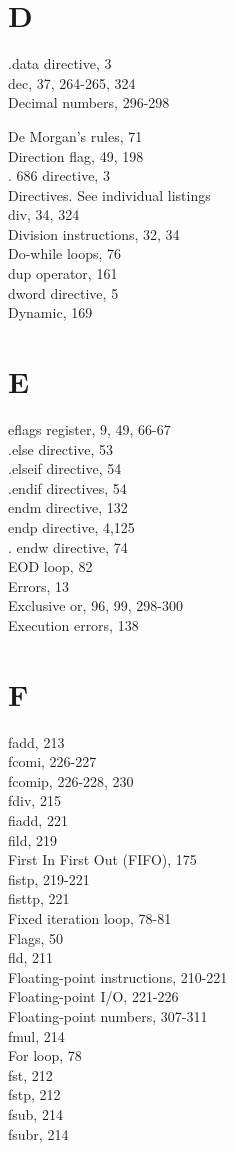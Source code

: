 \documentclass[10pt]{book}
\begin{document}
\section{D}
.data directive, 3\\
dec, 37, 264-265, 324\\
Decimal numbers, 296-298

De Morgan's rules, 71\\
Direction flag, 49, 198\\
. 686 directive, 3\\
Directives. See individual listings\\
div, 34, 324\\
Division instructions, 32, 34\\
Do-while loops, 76\\
dup operator, 161\\
dword directive, 5\\
Dynamic, 169

\section{E}
eflags register, 9, 49, 66-67\\
.else directive, 53\\
.elseif directive, 54\\
.endif directives, 54\\
endm directive, 132\\
endp directive, 4,125\\
. endw directive, 74\\
EOD loop, 82\\
Errors, 13\\
Exclusive or, 96, 99, 298-300\\
Execution errors, 138

\section{F}
fadd, 213\\
fcomi, 226-227\\
fcomip, 226-228, 230\\
fdiv, 215\\
fiadd, 221\\
fild, 219\\
First In First Out (FIFO), 175\\
fistp, 219-221\\
fisttp, 221\\
Fixed iteration loop, 78-81\\
Flags, 50\\
fld, 211\\
Floating-point instructions, 210-221\\
Floating-point I/O, 221-226\\
Floating-point numbers, 307-311\\
fmul, 214\\
For loop, 78\\
fst, 212\\
fstp, 212\\
fsub, 214\\
fsubr, 214
\end{document}
